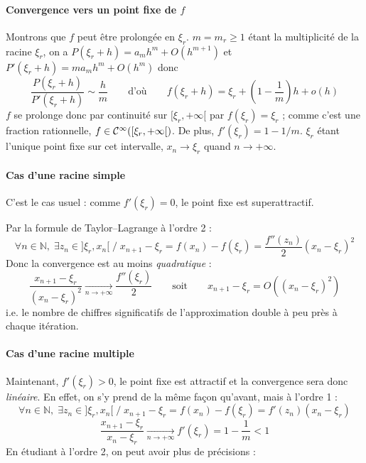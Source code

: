 \documentclass[a4paper, 11pt]{article}
\def\N{\mathbb{N}}
\def\Cf{{\cal{C}}}
\begin{document}
\paragraph{Convergence vers un point fixe de $f$}

Montrons que $f$ peut être prolongée en $\xi_r$. $m = m_r \geq 1$ étant la
multiplicité de la racine $\xi_r$, on a
$P(\xi_r + h) = a_{m}h^{m} + O(h^{m+1})$
et $P'(\xi_r + h) = ma_{m}h^{m} + O(h^m)$ 
donc
\[  \frac{P(\xi_r + h)}{P'(\xi_r + h)} \sim \frac{h}{m}
  \qquad \text{d'où} \qquad
  f(\xi_r + h) = \xi_r + \left( 1 - \frac{1}{m} \right)h + o(h)
\]
$f$ se prolonge donc par continuité sur $[\xi_r, +\infty[$ par $f(\xi_r) =
\xi_r$ ; comme c'est une fraction rationnelle, $f \in \Cf^\infty([\xi_r,
+\infty[)$. De plus, $f'(\xi_r) = 1 - 1/m$. $\xi_r$ étant l'unique point fixe
sur cet intervalle, $x_n \to \xi_r$ quand $n \to +\infty$.

\paragraph{Cas d'une racine simple}

C'est le cas usuel : comme $f'(\xi_r) = 0$, le point fixe est superattractif.

Par la formule de Taylor--Lagrange à l'ordre 2 :
\[ \forall n \in \N,\; \exists z_n \in ]\xi_r, x_n[ \;/\;
  x_{n+1} - \xi_r = f(x_n) - f(\xi_r) = \frac{f''(z_n)}{2} (x_n - \xi_r)^2
\]
Donc la convergence est au moins \emph{quadratique} :
\[ \frac{x_{n+1} - \xi_r}{(x_n - \xi_r)^2} \xrightarrow[n \to +\infty]{}
  \frac{f''(\xi_r)}{2} \qquad \text{soit} \qquad
  x_{n+1} - \xi_r = O\left( (x_n - \xi_r)^2 \right)
\]
i.e. le nombre de chiffres significatifs de l'approximation double à peu près à
chaque itération.

\paragraph{Cas d'une racine multiple}

Maintenant, $f'(\xi_r) > 0$, le point fixe est attractif et la convergence sera
donc \emph{linéaire}. En effet, on s'y prend de la même façon qu'avant, mais à
l'ordre 1 :
\[ \forall n \in \N,\; \exists z_n \in ]\xi_r, x_n[ \;/\;
  x_{n+1} - \xi_r = f(x_n) - f(\xi_r) = f'(z_n)(x_n - \xi_r)
\]
\[ \frac{x_{n+1} - \xi_r}{x_n - \xi_r} \xrightarrow[n \to +\infty]{}
  f'(\xi_r) = 1 - \frac{1}{m} < 1
\]
En étudiant à l'ordre 2, on peut avoir plus de précisions :
\end{document}
